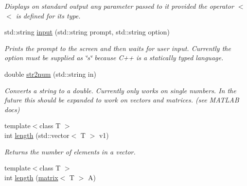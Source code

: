 \begin{DoxyCompactItemize}
\begin{DoxyCompactList}\small\item\em Displays on standard output any parameter passed to it provided the operator $<$$<$ is defined for its type. \end{DoxyCompactList}\item 
\hypertarget{namespacekeycpp_a2eb6a6f7647e6ff700b7992faecd986d}{std\-::string \hyperlink{namespacekeycpp_a2eb6a6f7647e6ff700b7992faecd986d}{input} (std\-::string prompt, std\-::string option)}\label{namespacekeycpp_a2eb6a6f7647e6ff700b7992faecd986d}

\begin{DoxyCompactList}\small\item\em Prints the prompt to the screen and then waits for user input. Currently the option must be supplied as \char`\"{}s\char`\"{} because C++ is a statically typed language. \end{DoxyCompactList}\item 
\hypertarget{namespacekeycpp_ac056ba33ff8585d5680daf09a45ff8e8}{double \hyperlink{namespacekeycpp_ac056ba33ff8585d5680daf09a45ff8e8}{str2num} (std\-::string in)}\label{namespacekeycpp_ac056ba33ff8585d5680daf09a45ff8e8}

\begin{DoxyCompactList}\small\item\em Converts a string to a double. Currently only works on single numbers. In the future this should be expanded to work on vectors and matrices. (see M\-A\-T\-L\-A\-B docs) \end{DoxyCompactList}\item 
\hypertarget{namespacekeycpp_a1e62ad4a7f9b872d69df78c09e3f7b59}{{\footnotesize template$<$class T $>$ }\\int \hyperlink{namespacekeycpp_a1e62ad4a7f9b872d69df78c09e3f7b59}{length} (std\-::vector$<$ T $>$ v1)}\label{namespacekeycpp_a1e62ad4a7f9b872d69df78c09e3f7b59}

\begin{DoxyCompactList}\small\item\em Returns the number of elements in a vector. \end{DoxyCompactList}\item 
\hypertarget{namespacekeycpp_afaef726cb38faec462ac53cff08ab113}{{\footnotesize template$<$class T $>$ }\\int \hyperlink{namespacekeycpp_afaef726cb38faec462ac53cff08ab113}{length} (\hyperlink{classkeycpp_1_1matrix}{matrix}$<$ T $>$ A)}\label{namespacekeycpp_afaef726cb38faec462ac53cff08ab113}


\end{DoxyCompactItemize}
